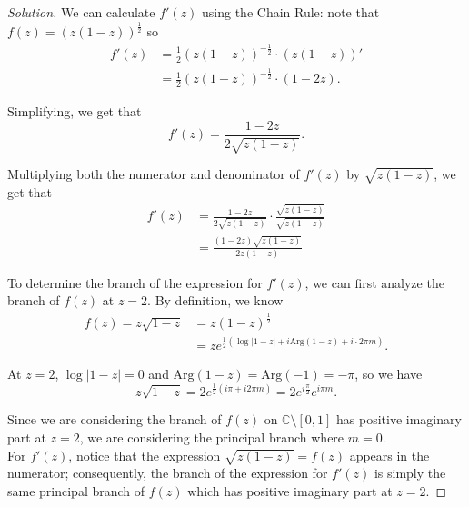 \documentclass[11pt]{article}
\newcommand{\C}{\mathbb{C}}
\newenvironment{solution}
  {\renewcommand\qedsymbol{$\blacksquare$}\begin{proof}[Solution]}
  {\end{proof}}
\theoremstyle{definition}
\begin{document}
\begin{solution}

    We can calculate $f'(z)$ using the Chain Rule: note that $f(z) = (z(1-z))^{\frac{1}{2}}$ so
\begin{align*}
     f'(z) &= \frac{1}{2} (z(1-z))^{-\frac{1}{2}} \cdot (z(1-z))' \\
     &= \frac{1}{2} (z(1-z))^{-\frac{1}{2}} \cdot (1-2z).
\end{align*}

Simplifying, we get that \[ f'(z) = \frac{1-2z}{2\sqrt{z(1-z)}}. \]

Multiplying both the numerator and denominator of $f'(z)$ by $\sqrt{z(1-z)}$, we get that
\begin{align*}
    f'(z) &= \frac{1-2z}{2\sqrt{z(1-z)}} \cdot \frac{\sqrt{z(1-z)}}{\sqrt{z(1-z)}} \\
    &= \frac{(1-2z)\sqrt{z(1-z)}}{2z(1-z)}
\end{align*}

To determine the branch of the expression for $f'(z)$, we can first analyze the branch of $f(z)$ at $z=2$. By definition, we know
\begin{align*}
    f(z) = z\sqrt{1-z} &= z(1-z)^{\frac{1}{2}} \\
    &= ze^{\frac{1}{2} \left(\log |1-z| + i \mathrm{Arg}(1-z) + i\cdot 2\pi m \right)}.
\end{align*}

At $z=2$, $\log |1-z| = 0$ and $\mathrm{Arg}(1-z) = \mathrm{Arg}(-1) = -\pi$, so we have
\[ z\sqrt{1-z} = 2e^{\frac{1}{2} \left(i \pi + i 2\pi m \right)} = 2e^{i \frac{\pi}{2}}e^{i \pi m}. \]

Since we are considering the branch of $f(z)$ on $\C \setminus [0, 1]$ has positive imaginary part at $z=2$, we are considering the principal branch where $m = 0$. \\

For $f'(z)$, notice that the expression $\sqrt{z(1-z)} = f(z)$ appears in the numerator; consequently, the branch of the expression for $f'(z)$ is simply the same principal branch of $f(z)$ which has positive imaginary part at $z=2$. 
\end{solution}
\end{document}
